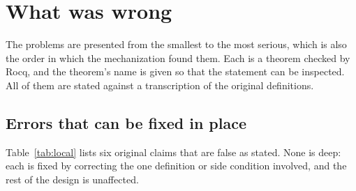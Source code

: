 \section{What was wrong}
\label{sec:wrong}

The problems are presented from the smallest to the most serious,
which is also the order in which the mechanization found them. Each is a
theorem checked by Rocq, and the theorem's name is given so that the
statement can be inspected. All of them are stated against a transcription of the original definitions.

\subsection{Errors that can be fixed in place}
\label{sec:local-errors}

Table~\ref{tab:local} lists six original claims that are false as stated.
None is deep: each is fixed by correcting the one definition or side
condition involved, and the rest of the design is unaffected.



